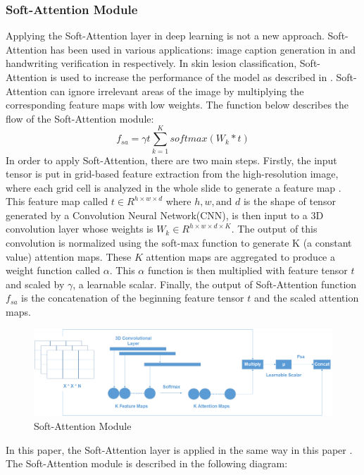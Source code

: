\documentclass[sensors,article,submit,pdftex,moreauthors]{Definitions/mdpi}
\begin{document}
\subsubsection{Soft-Attention Module}
Applying the Soft-Attention layer in deep learning is not a new approach. Soft-Attention has been used in various applications: image caption generation in \cite{03044} and handwriting verification in \cite{202017} respectively. In skin lesion classification, Soft-Attention is used to increase the performance of the model as described in \cite{03358}. Soft-Attention can ignore irrelevant areas of the image by multiplying the corresponding feature maps with low weights. The function below describes the flow of the Soft-Attention module:
\[
f_{sa} = \gamma t\sum_{k=1}^{K}softmax(W_k * t)
\]
In order to apply Soft-Attention, there are two main steps. Firstly, the input tensor is put in grid-based feature extraction from the high-resolution image, where each grid cell is analyzed in the whole slide to generate a feature map \cite{08513}. This feature map called $t \in R^{h \times w \times d}$ where $h, w, \text{and } d$ is the shape of tensor generated by a Convolution Neural Network(CNN), is then input to a 3D convolution layer whose weights is $W_k \in R^{h \times w \times d \times K}$. The output of this convolution is normalized using the soft-max function to generate K (a constant value) attention maps. These $K$ attention maps are aggregated to produce a weight function called $\alpha$. This $\alpha$ function is then multiplied with feature tensor $t$ and scaled by $\gamma$, a learnable scalar. Finally, the output of Soft-Attention function $f_{sa}$ is the concatenation of the beginning feature tensor $t$ and the scaled attention maps. 

\begin{figure}[H]
	\centering
	\includegraphics[width=1\linewidth]{Definitions/SoftAttention}
	\caption{Soft-Attention Module}
	\label{fig:soft-attention}
\end{figure}

In this paper, the Soft-Attention layer is applied in the same way in this paper \cite{03358}. The Soft-Attention module is described in the following diagram:
\end{document}
